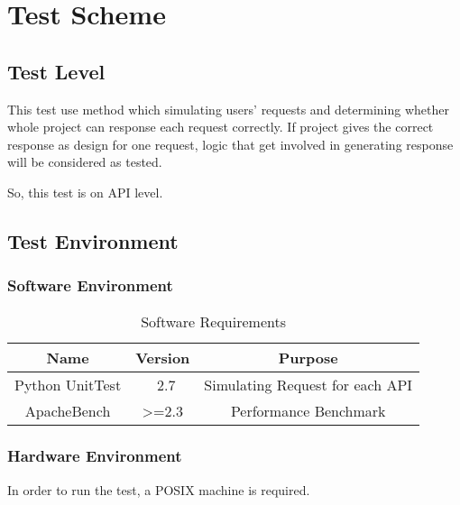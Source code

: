 \section{Test Scheme}
\label{sec:test_scheme}
\subsection{Test Level}
This test use method which simulating users' requests
and determining whether whole project can response each request correctly.
If project gives the correct response as design for one request, logic that get involved in generating response will be considered as tested.

So, this test is on API level.

\subsection{Test Environment}
\subsubsection{Software Environment}
\begin{table}[H]
  \begin{tabular}{c|c|c}
    \hline
    Name & Version & Purpose \\ \hline
    Python UnitTest & ~2.7 & Simulating Request for each API \\ \hline
    ApacheBench & >=2.3 & Performance Benchmark \\ \hline
  \end{tabular}
  \centering
  \caption{Software Requirements\label{tab:Software}}
\end{table}
\subsubsection{Hardware Environment}
In order to run the test, a POSIX machine is required.
